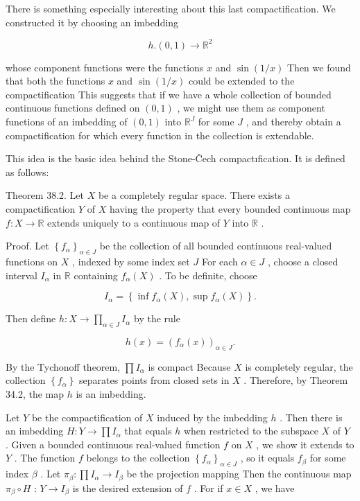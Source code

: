\documentclass[10pt]{article}
\begin{document}
There is something especially interesting about this last compactification. We constructed it by choosing an imbedding

\[
h.\left( {0,1}\right)  \rightarrow  {\mathbb{R}}^{2}
\]

whose component functions were the functions \(x\) and \(\sin \left( {1/x}\right)\) Then we found that both the functions \(x\) and \(\sin \left( {1/x}\right)\) could be extended to the compactification This suggests that if we have a whole collection of bounded continuous functions defined on \(\left( {0,1}\right)\) , we might use them as component functions of an imbedding of \(\left( {0,1}\right)\) into \({\mathbb{R}}^{J}\) for some \(J\) , and thereby obtain a compactification for which every function in the collection is extendable.

This idea is the basic idea behind the Stone-Čech compactıfication. It is defined as follows:

Theorem 38.2. Let \(X\) be a completely regular space. There exists a compactification \(Y\) of \(X\) having the property that every bounded continuous map \(f : X \rightarrow  \mathbb{R}\) extends uniquely to a continuous map of \(Y\) into \(\mathbb{R}\) .

Proof. Let \({\left\{  {f}_{\alpha }\right\}  }_{\alpha  \in  J}\) be the collection of all bounded continuous real-valued functions on \(X\) , indexed by some index set \(J\) For each \(\alpha  \in  J\) , choose a closed interval \({I}_{\alpha }\) in \(\mathbb{R}\) containing \({f}_{\alpha }\left( X\right)\) . To be definite, choose

\[
{I}_{\alpha } = \left\{  {\inf {f}_{\alpha }\left( X\right) ,\sup {f}_{\alpha }\left( X\right) }\right\}  .
\]

Then define \(h : X \rightarrow  \mathop{\prod }\limits_{{\alpha  \in  J}}{I}_{\alpha }\) by the rule

\[
h\left( x\right)  = {\left( {f}_{\alpha }\left( x\right) \right) }_{\alpha  \in  J}.
\]

By the Tychonoff theorem, \(\prod {I}_{\alpha }\) is compact Because \(X\) is completely regular, the collection \(\left\{  {f}_{\alpha }\right\}\) separates points from closed sets in \(X\) . Therefore, by Theorem 34.2, the map \(h\) is an imbedding.

Let \(Y\) be the compactification of \(X\) induced by the imbedding \(h\) . Then there is an imbedding \(H : Y \rightarrow  \prod {I}_{\alpha }\) that equals \(h\) when restricted to the subspace \(X\) of \(Y\) . Given a bounded continuous real-valued function \(f\) on \(X\) , we show it extends to \(Y\) . The function \(f\) belongs to the collection \({\left\{  {f}_{\alpha }\right\}  }_{\alpha  \in  J}\) , so it equals \({f}_{\beta }\) for some index \(\beta\) . Let \({\pi }_{\beta } : \prod {I}_{\alpha } \rightarrow  {I}_{\beta }\) be the projection mapping Then the continuous map \({\pi }_{\beta } \circ  H\) : \(Y \rightarrow  {I}_{\beta }\) is the desired extension of \(f\) . For if \(x \in  X\) , we have
\end{document}
